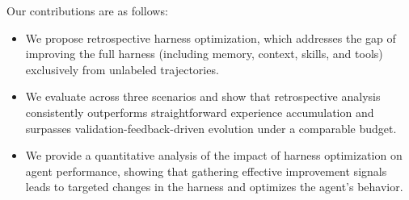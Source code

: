  Our contributions are as follows:
\begin{itemize}[label=$\diamond$]
    \item We propose retrospective harness optimization, which addresses the gap of improving the full harness (including memory, context, skills, and tools) exclusively from unlabeled trajectories.
    \item We evaluate \method{} across three scenarios and show that retrospective analysis consistently outperforms straightforward experience accumulation and surpasses validation-feedback-driven evolution under a comparable budget.
    \item We provide a quantitative analysis of the impact of harness optimization on agent performance, showing that gathering effective improvement signals leads to targeted changes in the harness and optimizes the agent's behavior.
\end{itemize}
